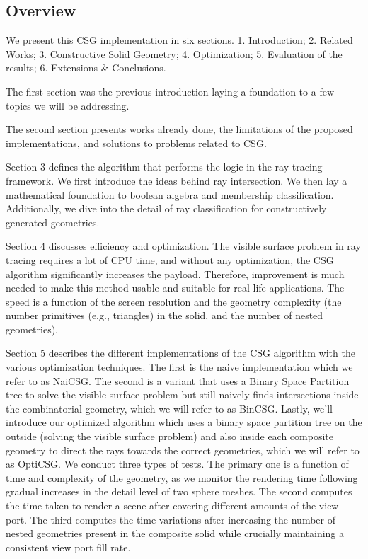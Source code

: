 \documentclass[a4paper,11pt,oneside]{article}
\begin{document}
\subsection{Overview}
  
We present this CSG implementation in six sections. 1. Introduction;  2. Related Works; 3. Constructive Solid Geometry; 4. Optimization; 5. Evaluation of the results; 6. Extensions \& Conclusions.

The first section was the previous introduction laying a foundation to a few topics we will be addressing. 
  
The second section presents works already done, the limitations of the proposed implementations, and solutions to problems related to CSG.
  
Section 3 defines the algorithm that performs the logic in the ray-tracing framework. We first introduce the ideas behind ray intersection. We then lay a mathematical foundation to boolean algebra and membership classification. Additionally, we dive into the detail of ray classification for constructively generated geometries. 
  
Section 4 discusses efficiency and optimization. The visible surface problem in ray tracing requires a lot of CPU time, and without any optimization, the CSG algorithm significantly increases the payload. Therefore, improvement is much needed to make this method usable and suitable for real-life applications. The speed is a function of the screen resolution and the geometry complexity (the number primitives (e.g., triangles) in the solid, and the number of nested geometries).
  
Section 5 describes the different implementations of the CSG algorithm with the various optimization techniques. The first is the naive implementation which we refer to as NaiCSG. The second is a variant that uses a Binary Space Partition tree to solve the visible surface problem but still naively finds intersections inside the combinatorial geometry, which we will refer to as BinCSG. Lastly, we'll introduce our optimized algorithm which uses a binary space partition tree on the outside (solving the visible surface problem) and also inside each composite geometry to direct the rays towards the correct geometries, which we will refer to as OptiCSG. We conduct three types of tests. The primary one is a function of time and complexity of the geometry, as we monitor the rendering time following gradual increases in the detail level of two sphere meshes. The second computes the time taken to render a scene after covering different amounts of the view port. The third computes the time variations after increasing the number of nested geometries present in the composite solid while crucially maintaining a consistent view port fill rate.
  
\end{document}

